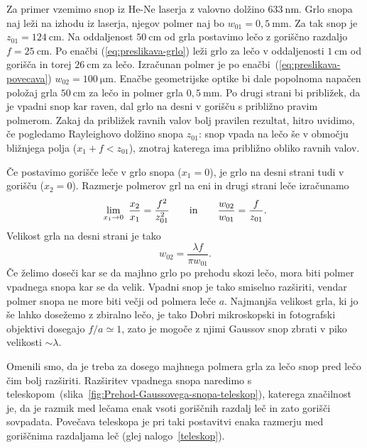 Za primer vzemimo snop iz He-Ne laserja z valovno dolžino 
$633~\si{\nano\metre}$. Grlo snopa naj leži na izhodu iz laserja, njegov polmer naj bo 
$w_{01}=0,5~\si{\milli\metre}$. Za tak snop je $z_{01}=124~\si{\centi\metre}$. 
Na oddaljenost $50~\si{\centi\metre}$ od grla postavimo lečo z goriščno razdaljo 
$f=25~\si{\centi\metre}$. Po enačbi (\ref{eq:preslikava-grlo})
leži grlo za lečo v oddaljenosti $1~\si{\centi\metre}$ od gorišča in torej $26~\si{\centi\metre}$ 
za lečo. Izračunan polmer je po enačbi~(\ref{eq:preslikava-povecava})
$w_{02}=100~\si{\micro\metre}$. Enačbe geometrijske optike bi
dale popolnoma napačen položaj grla $50~\si{\centi\metre}$ za lečo in polmer grla  
$0,5~\si{\milli\metre}$. Po drugi strani bi približek, da je vpadni
snop kar raven, dal grlo na desni v gorišču s približno pravim polmerom. Zakaj da približek ravnih 
valov bolj pravilen rezultat, hitro uvidimo, če pogledamo
Rayleighovo dolžino snopa $z_{01}$: 
snop vpada na lečo še v območju bližnjega polja ($x_1 + f < z_{01}$), znotraj katerega
ima približno obliko ravnih valov. 

Če postavimo gorišče leče v grlo snopa ($x_{1}=0$), je grlo na
desni strani tudi v gorišču ($x_{2}=0$). Razmerje polmerov grl
na eni in drugi strani leče izračunamo
\begin{equation}
\lim_{x_1 \to 0}~\frac{x_{2}}{x_{1}}=\frac{f^{2}}{z_{01}^{2}} \qquad \textrm{in} \qquad
\frac{w_{02}}{w_{01}}= \frac{f}{z_{01}}.\index{Gaussov snop!grlo}
\end{equation}
Velikost grla na desni strani je tako
\begin{equation}
w_{02}=\frac{\lambda f}{\pi w_{01}}.
\end{equation}
Če želimo doseči kar se da majhno grlo po prehodu skozi lečo, mora biti polmer
vpadnega snopa kar se da velik. Vpadni snop je tako smiselno
razširiti, vendar polmer snopa ne more biti večji od polmera leče $a$. 
Najmanjša velikost grla, ki jo še lahko dosežemo z zbiralno lečo, je tako 
Dobri mikroskopski in fotografski
objektivi dosegajo $f/a\simeq 1$, zato je mogoče z njimi Gaussov snop
zbrati v piko velikosti $\sim\lambda$. 

Omenili smo, da je treba za dosego majhnega polmera grla za lečo snop pred lečo čim bolj razširiti.
Razširitev vpadnega snopa naredimo s teleskopom~(slika~\ref{fig:Prehod-Gaussovega-snopa-teleskop}),
katerega značilnost je, da je razmik med lečama enak vsoti goriščnih razdalj leč in zato gorišči
sovpadata. Povečava teleskopa je pri taki postavitvi enaka razmerju med goriščnima razdaljama leč
(glej nalogo~\ref{teleskop}).

